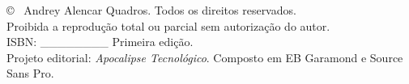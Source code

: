 \clearpage
\thispagestyle{empty}
\vspace*{0.55\textheight}
\noindent\footnotesize © \the\year\ Andrey Alencar Quadros. Todos os direitos reservados.\\
Proibida a reprodução total ou parcial sem autorização do autor.\\
ISBN: \_\_\_\_\_\_\_\_ \hfill Primeira edição.\\[1ex]
Projeto editorial: \textit{Apocalipse Tecnológico}. Composto em EB Garamond e Source Sans Pro.
\clearpage
